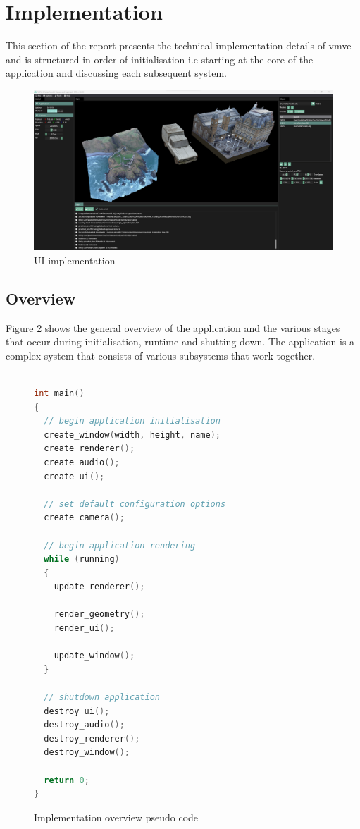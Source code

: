 \documentclass[11pt]{article}
\begin{document}
\clearpage
\section{Implementation} \label{implementation}

This section of the report presents the technical implementation details of
\gls*{vmve} and is structured in order of initialisation i.e starting at the
core of the application and discussing each subsequent system. 

\begin{figure}[H]
  \centering
  \includegraphics[width=\textwidth]{images/ui_implementation.png}
  \caption{UI implementation}
  \label{fig:user_interface}
\end{figure}



\subsection{Overview}
Figure \ref{fig:overview_pseudo_code} shows the general overview of the
application and the various stages that occur during initialisation, runtime and
shutting down. The application is a complex system that consists of various
subsystems that work together.


\begin{figure}[H]
\centering
\begin{lstlisting}[language=C++]

int main()
{
  // begin application initialisation
  create_window(width, height, name);
  create_renderer();
  create_audio();
  create_ui();

  // set default configuration options
  create_camera();
  
  // begin application rendering
  while (running)
  {
    update_renderer();

    render_geometry();
    render_ui();

    update_window();
  }

  // shutdown application
  destroy_ui();
  destroy_audio();
  destroy_renderer();
  destroy_window();

  return 0;
}
\end{lstlisting}
\caption{Implementation overview pseudo code}
\label{fig:overview_pseudo_code}
\end{figure}
\end{document}
